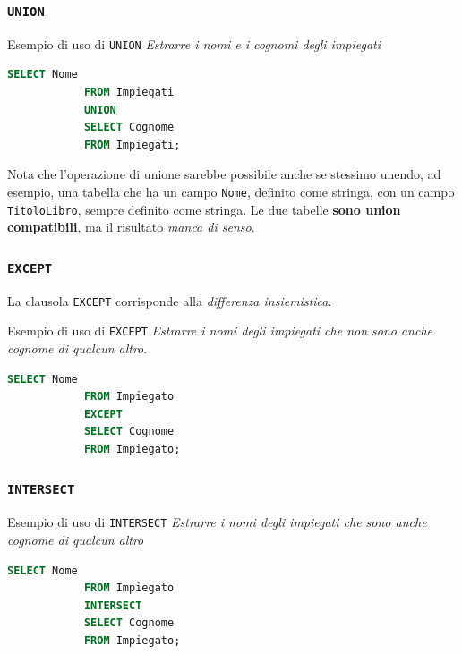\documentclass[12pt]{report}
\begin{document}
	\subsubsection*{\texttt{UNION}}
	\begin{esempio}{Esempio di uso di \texttt{UNION}}{}
		\textit{Estrarre i nomi e i cognomi degli impiegati}
		\begin{lstlisting}[language=SQL]
			SELECT Nome
			FROM Impiegati
			UNION
			SELECT Cognome
			FROM Impiegati;
		\end{lstlisting}
	\end{esempio}
	Nota che l'operazione di unione sarebbe possibile anche se stessimo unendo, ad esempio, una tabella che ha un campo \texttt{Nome}, definito come stringa, con un campo \texttt{TitoloLibro}, sempre definito come stringa. Le due tabelle \textbf{sono union compatibili}, ma il risultato \textit{manca di senso}.
	
	\subsubsection*{\texttt{EXCEPT}}
	La clausola \texttt{EXCEPT} corrisponde alla \textit{differenza insiemistica}.
	\begin{esempio}{Esempio di uso di \texttt{EXCEPT}}{}
		\textit{Estrarre i nomi degli impiegati che non sono anche cognome di qualcun altro}.
		\begin{lstlisting}[language=SQL]
			SELECT Nome
			FROM Impiegato
			EXCEPT
			SELECT Cognome
			FROM Impiegato;
		\end{lstlisting}
	\end{esempio}
	
	\subsubsection*{\texttt{INTERSECT}}
	\begin{esempio}{Esempio di uso di \texttt{INTERSECT}}{}
		\textit{Estrarre i nomi degli impiegati che sono anche cognome di qualcun altro}
		\begin{lstlisting}[language=SQL]
			SELECT Nome
			FROM Impiegato
			INTERSECT
			SELECT Cognome
			FROM Impiegato;
		\end{lstlisting}
	\end{esempio}
	
\end{document}
